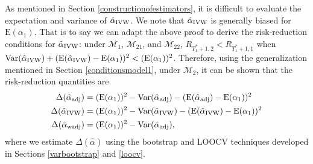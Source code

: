 \documentclass[11pt]{article}
\def\mrm#1{\mathrm{#1}} %
\def\mc#1{\mathcal{#1}} %
\def\E#1{\mathrm{E}(#1)} %
\def\var#1{\mathrm{Var}(#1)} %
\theoremstyle{definition}
\begin{document}

 


As mentioned in Section \ref{constructionofestimators}, it is difficult to evaluate the expectation and variance of $\hat{\alpha}_{\rm IVW}$. We note that $\hat{\alpha}_{\rm IVW}$ is generally biased for $\E{\alpha_1}$. That is to say we can adapt the above proof to derive the risk-reduction conditions for $\hat{\alpha}_{\rm IVW}$: under $\mc{M}_{1}$, $\mc{M}_{21}$, and $\mc{M}_{22}$, $R_{T_1^*+1,2}<R_{T_1^*+1,1}$ when $\var{\hat{\alpha}_{\rm IVW}} +(\E{\hat{\alpha}_{\rm IVW}}-\E{\alpha_1})^2<(\E{\alpha_1})^2$.  Therefore, using the generalization mentioned in Section \ref{conditionsmodel1}, under $\mc{M}_2$, it can be shown that the risk-reduction quantities are
\begin{align*}
  \Delta(\hat{\alpha}_{\rm adj}) 
  &= (\E{\alpha_1})^2 -\var{\hat{\alpha}_{\rm adj}}-(\E{\hat{\alpha}_{\rm adj}}-\E{\alpha_1})^2\\
  \Delta(\hat{\alpha}_{\rm IVW}) 
  &= (\E{\alpha_1})^2 -\var{\hat{\alpha}_{\rm IVW}}-(\E{\hat{\alpha}_{\rm IVW}}-\E{\alpha_1})^2\\
  \Delta(\hat{\alpha}_{\rm wadj}) 
  &= (\E{\alpha_1})^2 -\var{\hat{\alpha}_{\rm adj}},
\end{align*}
where we estimate $\Delta(\hat{\alpha})$  using the bootstrap and LOOCV techniques developed in Sections \ref{varbootstrap} and \ref{loocv}. 
 
\end{document}
